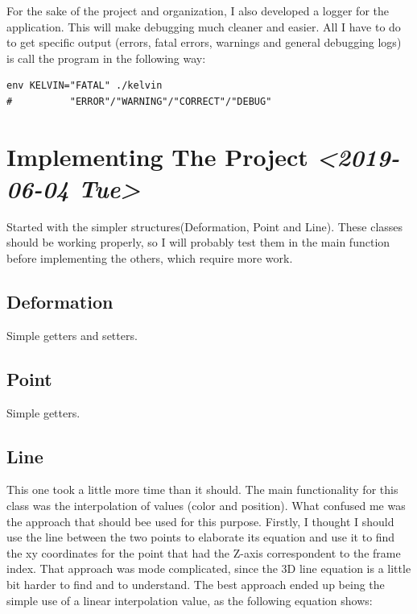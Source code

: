 \documentclass[11pt]{article}
\begin{document}
For the sake of the project and organization, I also developed a logger for the application. This will make debugging much cleaner and easier. All I have to do to get specific output (errors, fatal errors, warnings and general debugging logs) is call the program in the following way:

\begin{verbatim}
env KELVIN="FATAL" ./kelvin
#          "ERROR"/"WARNING"/"CORRECT"/"DEBUG"
\end{verbatim}

\section*{Implementing The Project \textit{<2019-06-04 Tue>}}
\label{sec:org92c2689}

Started with the simpler structures(Deformation, Point and Line). These classes should be working properly, so I will probably test them in the main function before implementing the others, which require more work.

\subsection*{Deformation}
\label{sec:org8e80fc0}

Simple getters and setters.

\subsection*{Point}
\label{sec:orge8a8450}

Simple getters.

\subsection*{Line}
\label{sec:org68b53b3}

This one took a little more time than it should. The main functionality for this class was the interpolation of values (color and position). What confused me was the approach that should bee used for this purpose. Firstly, I thought I should use the line between the two points to elaborate its equation and use it to find the xy coordinates for the point that had the Z-axis correspondent to the frame index. That approach was mode complicated, since the 3D line equation is a little bit harder to find and to understand. The best approach ended up being the simple use of a linear interpolation value, as the following equation shows:
\end{document}

